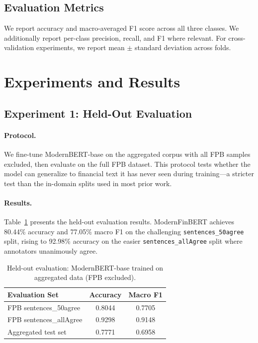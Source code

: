 \documentclass[11pt]{article}
\begin{document}
\subsection{Evaluation Metrics}

We report accuracy and macro-averaged F1 score across all three classes. We additionally report per-class precision, recall, and F1 where relevant. For cross-validation experiments, we report mean $\pm$ standard deviation across folds.

\section{Experiments and Results}
\label{sec:results}

\subsection{Experiment 1: Held-Out Evaluation}
\label{sec:held-out}

\paragraph{Protocol.}
We fine-tune ModernBERT-base on the aggregated corpus with all FPB samples excluded, then evaluate on the full FPB dataset. This protocol tests whether the model can generalize to financial text it has never seen during training---a stricter test than the in-domain splits used in most prior work.

\paragraph{Results.}
Table~\ref{tab:held-out} presents the held-out evaluation results. ModernFinBERT achieves 80.44\% accuracy and 77.05\% macro F1 on the challenging \texttt{sentences\_50agree} split, rising to 92.98\% accuracy on the easier \texttt{sentences\_allAgree} split where annotators unanimously agree.

\begin{table}[h]
\centering
\caption{Held-out evaluation: ModernBERT-base trained on aggregated data (FPB excluded).}
\label{tab:held-out}
\begin{tabular}{lcc}
\toprule
\textbf{Evaluation Set} & \textbf{Accuracy} & \textbf{Macro F1} \\
\midrule
FPB sentences\_50agree & 0.8044 & 0.7705 \\
FPB sentences\_allAgree & 0.9298 & 0.9148 \\
Aggregated test set & 0.7771 & 0.6958 \\
\bottomrule
\end{tabular}
\end{table}
\end{document}
